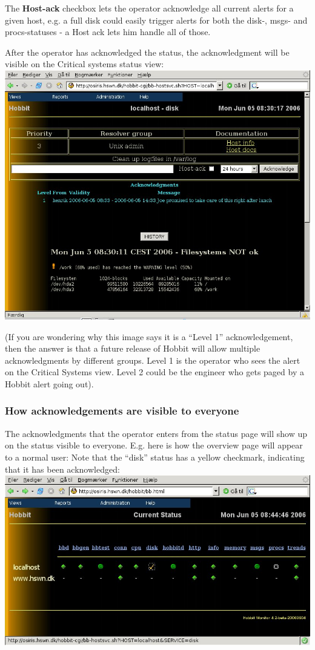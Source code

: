  The \textbf{Host-ack}
 checkbox lets the operator acknowledge all current alerts for a given host, e.g. a full disk could easily trigger alerts for both the disk-, msgs- and procs-statuses - a Host ack lets him handle all of those.


 After the operator has acknowledged the status, the acknowledgment will be visible on the Critical systems status view:\\ 
\includegraphics[scale=1]{./critview-detail-acked.png} 


 (If you are wondering why this image says it is a ``Level 1'' acknowledgement, then the answer is that a future release of Hobbit will allow multiple acknowledgments by different groups. Level 1 is the operator who sees the alert on the Critical Systems view. Level 2 could be the engineer who gets paged by a Hobbit alert going out).
\subsubsection*{How acknowledgements are visible to everyone}


 The acknowledgments that the operator enters from the status page will show up on the status visible to everyone. E.g. here is how the overview page will appear to a normal user: Note that the ``disk'' status has a yellow checkmark, indicating that it has been acknowledged:\\ 
\includegraphics[scale=1]{./mainview-acked.png} 


